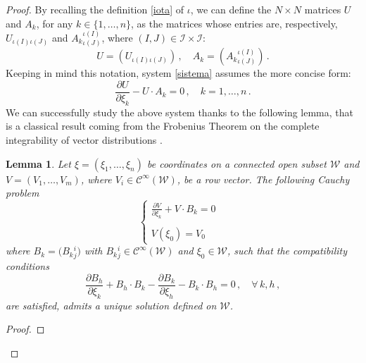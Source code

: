 \documentclass{article}
\newtheorem{lemma}[thm]{Lemma}
\newcommand{\I}{\mathcal{I}}
\newcommand{\de}{\partial}
\begin{document}
\begin{proof}
\noindent
By recalling the definition \eqref{iota} of $\iota$, we can define the $N\times N$ matrices $U$ and $A_k$, for any $k\in\{1,\dots,n\}$, as the matrices whose entries are, respectively, $U_{\iota(I)\iota(J)}$ and $A_k{}^{\iota(I)}_{\iota(J)}$, where $(I,J)\in\I\times\I$:
\begin{equation}\label{U.Ak}
U=\left(U_{\iota(I)\iota(J)}\right)\,,\quad A_k=\left(A_k{}^{\iota(I)}_{\iota(J)}\right)\,.
\end{equation}
Keeping in mind this notation, system \eqref{sistema} assumes the more concise form:
\begin{equation}\label{sistema2}
\frac{\de U }{\de\xi_k }-U\cdot A_k=0\,,\quad k=1,\dots,n\,.
\end{equation}
%
% 
We can successfully study the above system thanks to the following lemma, that is a classical result coming from the Frobenius Theorem on the complete integrability of vector distributions \cite{warner}.
%
\begin{lemma}\label{lemma.Frob}
Let $\xi=(\xi_1,\dots,\xi_n)$ be coordinates on a connected open subset $\mathcal{W}$ and $V=(V_1,\dots,V_m)$, where $V_i\in\mathcal{C}^\infty(\mathcal{W})$, be a row vector. The following Cauchy problem
\begin{equation}\label{eq:sistema.V}
\left\{
\begin{array}{ll}
\frac{\de V }{\de\xi_k }+ V\cdot B_k=0 &
\\
\\
V(\xi_0)=V_{0}&
\end{array}
\right.
\end{equation}
where $B_k=\big(B_k{}^i_j\big)$ with
$B_k{}^i_j\in\mathcal{C}^\infty(\mathcal{W})$ and
$\xi_0\in\mathcal{W}$, such that the compatibility conditions
\begin{equation}\label{eq:cond.comp.5}
\frac{\de B_h }{\de\xi_k }+B_h\cdot B_k-\frac{\de B_k }{\de\xi_h }-B_k\cdot B_h=0\,,\quad\forall\,k,h\,,
\end{equation}
are satisfied, admits a unique solution defined on $\mathcal{W}$.
\end{lemma}
\begin{proof}

\end{proof}
\end{proof}
\end{document}
